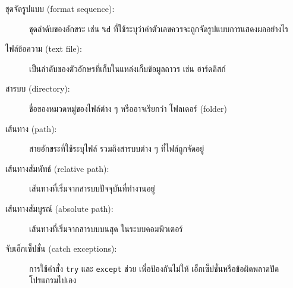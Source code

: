\begin{description}
\item[ชุดจัดรูปแบบ (format sequence):] 
ชุดลำดับของอักขระ เช่น \texttt{\%d} ที่ใช้ระบุว่าค่าตัวเลขควรจะถูกจัดรูปแบบการแสดงผลอย่างไร


\item[ไฟล์ข้อความ (text file):] 
เป็นลำดับของตัวอักษรที่เก็บในแหล่งเก็บข้อมูลถาวร เช่น ฮาร์ดดิสก์


\item[สารบบ (directory):] ชื่อของหมวดหมู่ของไฟล์ต่าง ๆ หรืออาจเรียกว่า โฟลเดอร์ (folder)


\item[เส้นทาง (path):] สายอักขระที่ใช้ระบุไฟล์ รวมถึงสารบบต่าง ๆ ที่ไฟล์ถูกจัดอยู่


\item[เส้นทางสัมพัทธ์ (relative path):] เส้นทางที่เริ่มจากสารบบปัจจุบันที่ทำงานอยู่


\item[เส้นทางสัมบูรณ์ (absolute path):] 
เส้นทางที่เริ่มจากสารบบบนสุด ในระบบคอมพิวเตอร์


\item[จับเอ็กเซ็ปชั่น (catch exceptions):] 
การใช้คำสั่ง \texttt{try} และ \texttt{except} 
ช่วย เพื่อป้องกันไม่ให้ เอ็กเซ็ปชั่นหรือข้อผิดพลาดปิดโปรแกรมไปเอง


\end{description}
